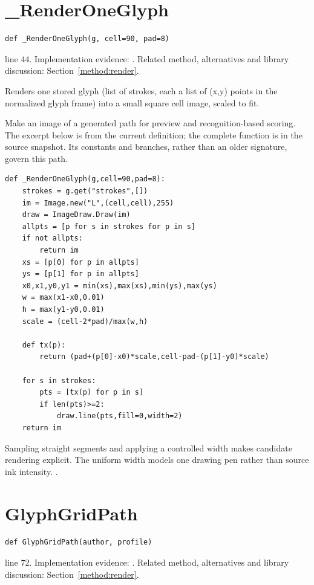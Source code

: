 \section{\_RenderOneGlyph}\label{fn:web-render:-RenderOneGlyph}
\begin{lstlisting}[style=sig]
def _RenderOneGlyph(g, cell=90, pad=8)
\end{lstlisting}
 line 44. Implementation evidence: \cite{code2026}. Related method, alternatives and library discussion: Section~\ref{method:render}.


Renders one stored glyph (list of strokes, each a list of (x,y) points in the normalized glyph frame) into a small square cell image, scaled to fit.


Make an image of a generated path for preview and recognition-based scoring. The excerpt below is from the current definition; the complete function is in the source snapshot. Its constants and branches, rather than an older signature, govern this path.


\begin{lstlisting}[style=plain]
def _RenderOneGlyph(g,cell=90,pad=8):
    strokes = g.get("strokes",[])
    im = Image.new("L",(cell,cell),255)
    draw = ImageDraw.Draw(im)
    allpts = [p for s in strokes for p in s]
    if not allpts:
        return im
    xs = [p[0] for p in allpts]
    ys = [p[1] for p in allpts]
    x0,x1,y0,y1 = min(xs),max(xs),min(ys),max(ys)
    w = max(x1-x0,0.01)
    h = max(y1-y0,0.01)
    scale = (cell-2*pad)/max(w,h)

    def tx(p):
        return (pad+(p[0]-x0)*scale,cell-pad-(p[1]-y0)*scale)

    for s in strokes:
        pts = [tx(p) for p in s]
        if len(pts)>=2:
            draw.line(pts,fill=0,width=2)
    return im
\end{lstlisting}
Sampling straight segments and applying a controlled width makes candidate rendering explicit. The uniform width models one drawing pen rather than source ink intensity. \cite{pillowdraw,opencvdraw,code2026}.


\section{GlyphGridPath}\label{fn:web-render:GlyphGridPath}
\begin{lstlisting}[style=sig]
def GlyphGridPath(author, profile)
\end{lstlisting}
 line 72. Implementation evidence: \cite{code2026}. Related method, alternatives and library discussion: Section~\ref{method:render}.


